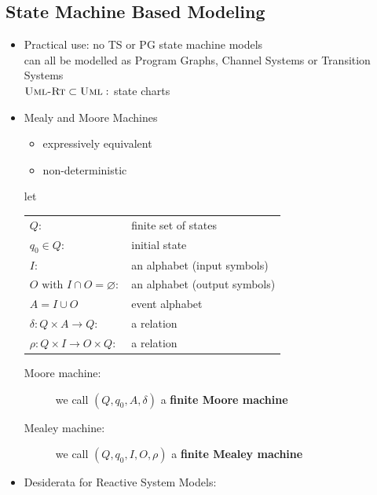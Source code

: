 \documentclass[a4paper, 10pt]{article}
\begin{document}
\subsection*{State Machine Based Modeling}
\begin{itemize}
    \item Practical use: no TS or PG \follows \; state machine models \\
    can all be modelled as Program Graphs, Channel Systems or Transition Systems \\
    $\textsc{Uml-Rt} \subset \textsc{Uml}:$ state charts
    \item Mealy and Moore Machines \\
    \begin{itemize}
        \item  expressively equivalent
        \item non-deterministic
    \end{itemize}
    \begin{shaded} let
    \begin{tabular}{ll}
        $Q:$ & finite set of states \\
        $q_0\in Q$: & initial state \\
        $I$: & an alphabet (input symbols) \\
        $O \textrm{ with }I\cap O=\varnothing:$ & an alphabet (output symbols) \\
        $A=I\cup O$ & event alphabet \\
        $\delta: Q\times A\to Q:$ & a relation \\
        $\rho: Q\times I\to O\times Q:$ & a relation \\
        \end{tabular}
    \begin{description}
        \item[Moore machine:] we call $(Q, q_0, A, \delta)$ a \textbf{finite Moore machine}
        \begin{center}
        \scalebox{1}{}
        \end{center}
        \item[Mealey machine:] we call $(Q,q_0,I,O,\rho)$ a \textbf{finite Mealey machine}
        \begin{center}
        \scalebox{1}{}
        \end{center}
    \end{description}
\end{shaded}
    \item Desiderata for Reactive System Models:

\end{itemize}
\end{document}
